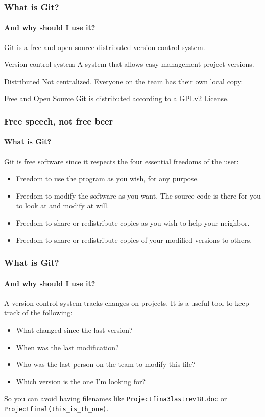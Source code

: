 \documentclass{}{beamer}
\newcommand{\spacepls}{\vspace{1.5Ex}}
\begin{document}
\begin{frame}[t]
	\frametitle{What is Git?}
	\framesubtitle{And why should I use it?}

	\spacepls

	Git is a {\color{OliveGreen}free and open source} \alert{distributed} {\color{MidnightBlue}version control system}. \pause

	\begin{block}{Version control system}	
		A system that allows easy management project versions.
	\end{block} \pause

	\begin{alertblock}{Distributed}	
		Not centralized. Everyone on the team has their own local copy.
	\end{alertblock} \pause

	\begin{exampleblock}{Free and Open Source}	
		Git is distributed according to a GPLv2 License.
	\end{exampleblock}
	
\end{frame}


\begin{frame}[t]
	\frametitle{Free speech, not free beer}
	\framesubtitle{What is Git?}

	Git is free software since it respects the four essential freedoms of the user: \pause

	\begin{itemize}
		\item Freedom to use the program as you wish, for any purpose. \pause
		\item Freedom to modify the software as you want. The source code is there for you to look at and modify at will. \pause
		\item Freedom to share or redistribute copies as you wish to help your neighbor. \pause
		\item Freedom to share or redistribute copies of your modified versions to others.
	\end{itemize}
	
\end{frame}

\begin{frame}[t]
	\frametitle{What is Git?}
	\framesubtitle{And why should I use it?}

	A version control system tracks changes on projects.
	It is a useful tool to keep track of the following: \pause

	\begin{itemize}
		\item What changed since the last version? \pause
		\item When was the last modification? \pause
		\item Who was the last person on the team to modify this file? \pause
		\item Which version is the one I'm looking for? \pause
	\end{itemize}

	So you can avoid having filenames like \texttt{Projectfina3lastrev18.doc} or \texttt{Projectfinal(this\_is\_th\_one)}.

\end{frame}
\end{document}
